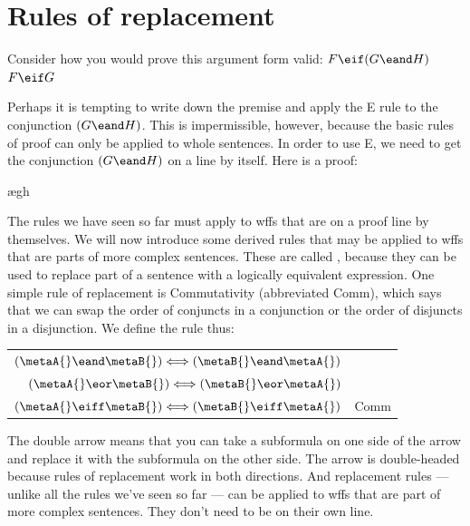 \section{Rules of replacement}

Consider how you would prove this argument form valid: $F\eif(G\eand H)$ \therefore\ $F\eif G$

Perhaps it is tempting to write down the premise and apply the {\eand}E rule to the conjunction $(G \eand H)$. This is impermissible, however, because the basic rules of proof can only be applied to whole sentences. In order to use {\eand}E, we need to get the conjunction $(G \eand H)$ on a line by itself. Here is a proof:

\begin{ndproof}
	\open
		\ae{gh}
	\close
\end{ndproof}

The rules we have seen so far must apply to wffs that are on a proof line by themselves. We will now introduce some derived rules that may be applied to wffs that are parts of more complex sentences. These are called , because they can be used to replace part of a sentence with a logically equivalent expression. One simple rule of replacement is Commutativity (abbreviated Comm), which says that we can swap the order of conjuncts in a conjunction or the order of disjuncts in a disjunction. We define the rule thus:

\begin{center}
\begin{tabular}{rl}
$(\metaA{}\eand\metaB{}) \Longleftrightarrow (\metaB{}\eand\metaA{})$\\
$(\metaA{}\eor\metaB{}) \Longleftrightarrow (\metaB{}\eor\metaA{})$\\
$(\metaA{}\eiff\metaB{}) \Longleftrightarrow (\metaB{}\eiff\metaA{})$
& Comm
\end{tabular}
\end{center}

The double arrow means that you can take a subformula on one side of the arrow and replace it with the subformula on the other side. The arrow is double-headed because rules of replacement work in both directions. And replacement rules --- unlike all the rules we've seen so far --- can be applied to wffs that are part of more complex sentences. They don't need to be on their own line.

